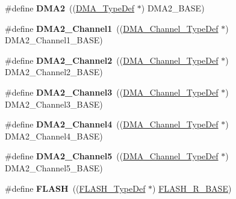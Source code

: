 \begin{DoxyCompactItemize}
\item 
\mbox{\label{group___peripheral__declaration_ga506520140eec1708bc7570c49bdf972d}} 
\#define {\bfseries D\+M\+A2}~((\hyperlink{struct_d_m_a___type_def}{D\+M\+A\+\_\+\+Type\+Def} $\ast$) D\+M\+A2\+\_\+\+B\+A\+SE)
\item 
\mbox{\label{group___peripheral__declaration_gad86c75e1ff89e03e15570f47962865c8}} 
\#define {\bfseries D\+M\+A2\+\_\+\+Channel1}~((\hyperlink{struct_d_m_a___channel___type_def}{D\+M\+A\+\_\+\+Channel\+\_\+\+Type\+Def} $\ast$) D\+M\+A2\+\_\+\+Channel1\+\_\+\+B\+A\+SE)
\item 
\mbox{\label{group___peripheral__declaration_ga316024020799373b9d8e35c316c74f24}} 
\#define {\bfseries D\+M\+A2\+\_\+\+Channel2}~((\hyperlink{struct_d_m_a___channel___type_def}{D\+M\+A\+\_\+\+Channel\+\_\+\+Type\+Def} $\ast$) D\+M\+A2\+\_\+\+Channel2\+\_\+\+B\+A\+SE)
\item 
\mbox{\label{group___peripheral__declaration_ga6dca52a79587e0ca9a5d669048b4c7eb}} 
\#define {\bfseries D\+M\+A2\+\_\+\+Channel3}~((\hyperlink{struct_d_m_a___channel___type_def}{D\+M\+A\+\_\+\+Channel\+\_\+\+Type\+Def} $\ast$) D\+M\+A2\+\_\+\+Channel3\+\_\+\+B\+A\+SE)
\item 
\mbox{\label{group___peripheral__declaration_ga612b396657695191ad740b0b59bc9f12}} 
\#define {\bfseries D\+M\+A2\+\_\+\+Channel4}~((\hyperlink{struct_d_m_a___channel___type_def}{D\+M\+A\+\_\+\+Channel\+\_\+\+Type\+Def} $\ast$) D\+M\+A2\+\_\+\+Channel4\+\_\+\+B\+A\+SE)
\item 
\mbox{\label{group___peripheral__declaration_ga521c13b7d0f82a6897d47995da392750}} 
\#define {\bfseries D\+M\+A2\+\_\+\+Channel5}~((\hyperlink{struct_d_m_a___channel___type_def}{D\+M\+A\+\_\+\+Channel\+\_\+\+Type\+Def} $\ast$) D\+M\+A2\+\_\+\+Channel5\+\_\+\+B\+A\+SE)
\item 
\mbox{\label{group___peripheral__declaration_ga844ea28ba1e0a5a0e497f16b61ea306b}} 
\#define {\bfseries F\+L\+A\+SH}~((\hyperlink{struct_f_l_a_s_h___type_def}{F\+L\+A\+S\+H\+\_\+\+Type\+Def} $\ast$) \hyperlink{group___peripheral__memory__map_ga8e21f4845015730c5731763169ec0e9b}{F\+L\+A\+S\+H\+\_\+\+R\+\_\+\+B\+A\+SE})

\end{DoxyCompactItemize}
